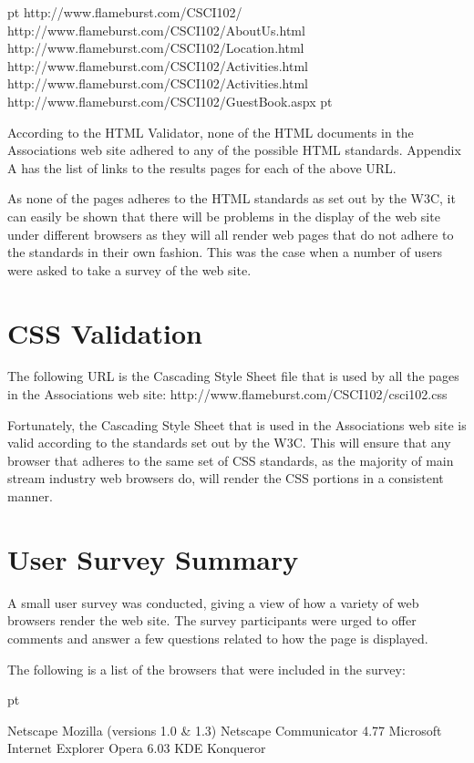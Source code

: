  pt
\items http://www.flameburst.com/CSCI102/
\items http://www.flameburst.com/CSCI102/AboutUs.html
\items http://www.flameburst.com/CSCI102/Location.html
\items http://www.flameburst.com/CSCI102/Activities.html
\items http://www.flameburst.com/CSCI102/Activities.html
\items http://www.flameburst.com/CSCI102/GuestBook.aspx
 pt

According to the HTML Validator, none of the HTML documents in the Associations
web site adhered to any of the possible HTML standards. Appendix A has the list
of links to the results pages for each of the above URL.

As none of the pages adheres to the HTML standards as set out by the W3C, it
can easily be shown that there will be problems in the display of the web site
under different browsers as they will all render web pages that do not adhere
to the standards in their own fashion. This was the case when a number of users
were asked to take a survey of the web site.

\section{CSS Validation}

The following URL is the Cascading Style Sheet file that is used by all the
pages in the Associations web site:
http://www.flameburst.com/CSCI102/csci102.css

Fortunately, the Cascading Style Sheet that is used in the Associations web site
is valid according to the standards set out by the W3C. This will ensure that
any browser that adheres to the same set of CSS standards, as the majority of
main stream industry web browsers do, will render the CSS portions in a
consistent manner.

\section{User Survey Summary}

A small user survey was conducted, giving a view of how a variety of web
browsers render the web site. The survey participants were urged to offer
comments and answer a few questions related to how the page is displayed.

The following is a list of the browsers that were included in the survey:

 pt

\items Netscape Mozilla (versions 1.0 \& 1.3)
\items Netscape Communicator 4.77
\items Microsoft Internet Explorer
\items Opera 6.03
\items KDE Konqueror

